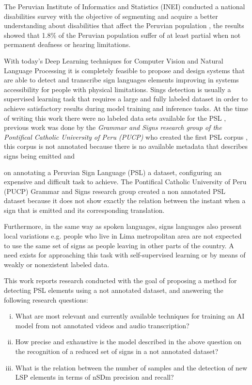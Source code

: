 \documentclass[twocolumn,conference]{article}
\begin{document}
The Peruvian Institute of Informatics and Statistics (INEI) conducted a national disabilities survey with the objective of segmenting and acquire a better understanding about disabilities that affect the Peruvian population \cite{disabilities_survey_2012}, the results showed that 1.8\% of the Peruvian population suffer of at least partial when not permanent deafness or hearing limitations. 

With today's Deep Learning techniques for Computer Vision and Natural Language Processing it is completely feasible to propose and design systems that are able to detect and transcribe sign languages elements improving in systems accessibility for people with physical limitations. Sings detection is usually a supervised learning task that requires a large and fully labeled dataset in order to achieve satisfactory results during model training and inference tasks. At the time  of writing this work there were no labeled data sets available for the PSL \cite{lsp_2015}, previous work was done by the \textit{Grammar and Signs research group of the Pontifical Catholic University of Peru (PUCP)} who created the first PSL corpus \cite{lsp_dataset}, this corpus is not annotated because there is no available metadata that describes signs being emitted and

  on annotating a Peruvian Sign Language (PSL) \cite{lsp_2015} a dataset, configuring an expensive and difficult task to achieve. The Pontifical Catholic University of Peru (PUCP) Grammar and  Signs research group created a non annotated PSL dataset \cite{lsp_dataset} because it does not show exactly the relation between the instant when a sign that is emitted and its corresponding translation.

Furthermore, in the same way as spoken languages, signs languages also present local variations e.g. people who live in Lima metropolitan area are not expected to use the same set of signs as people leaving in other parts of the country. A need exists for approaching this task with self-supervised learning or by means of weakly or nonexistent labeled data.

This work reports research conducted with the goal of proposing a method for detecting PSL elements using a not annotated dataset, and answering the following research questions:

\begin{enumerate}[(i)]
\item What are most relevant and currently available techniques for training an AI model from not annotated videos and audio transcription?\label{q1}
\item How precise and exhaustive is the model described in the above question on the recognition of a reduced set of signs in a not annotated dataset?\label{q2}
\item What is the relation between the number of samples and the detection of new LSP elements in terms of nSDm precision and recall?\label{q3}
\end{enumerate}
\end{document}
